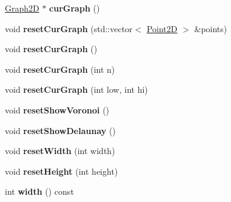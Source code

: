 \begin{DoxyCompactItemize}
\item 
\hyperlink{classcmst_1_1_graph2_d}{Graph2D} $\ast$ {\bfseries cur\+Graph} ()\hypertarget{classcmst_1_1_window_a83548b1c4406f37a812a0920fc4d6669}{}\label{classcmst_1_1_window_a83548b1c4406f37a812a0920fc4d6669}

\item 
void {\bfseries reset\+Cur\+Graph} (std\+::vector$<$ \hyperlink{classcmst_1_1_point2_d}{Point2D} $>$ \&points)\hypertarget{classcmst_1_1_window_adfa83ea52f2c09def65b79cdf57092ad}{}\label{classcmst_1_1_window_adfa83ea52f2c09def65b79cdf57092ad}

\item 
void {\bfseries reset\+Cur\+Graph} ()\hypertarget{classcmst_1_1_window_a08365866ac2ffa9793c25c92750341e2}{}\label{classcmst_1_1_window_a08365866ac2ffa9793c25c92750341e2}

\item 
void {\bfseries reset\+Cur\+Graph} (int n)\hypertarget{classcmst_1_1_window_a83743944c1c6429f0eb9f3c72c9b7f22}{}\label{classcmst_1_1_window_a83743944c1c6429f0eb9f3c72c9b7f22}

\item 
void {\bfseries reset\+Cur\+Graph} (int low, int hi)\hypertarget{classcmst_1_1_window_aa4ad17303edd88d526b66f9e6918fe7a}{}\label{classcmst_1_1_window_aa4ad17303edd88d526b66f9e6918fe7a}

\item 
void {\bfseries reset\+Show\+Voronoi} ()\hypertarget{classcmst_1_1_window_a16c34af3c8fd6be061df93e36cbb405e}{}\label{classcmst_1_1_window_a16c34af3c8fd6be061df93e36cbb405e}

\item 
void {\bfseries reset\+Show\+Delaunay} ()\hypertarget{classcmst_1_1_window_ae54c419d28bd352f52a3beffa6fc1f32}{}\label{classcmst_1_1_window_ae54c419d28bd352f52a3beffa6fc1f32}

\item 
void {\bfseries reset\+Width} (int width)\hypertarget{classcmst_1_1_window_a3f234daf3198e3611892515f1721de44}{}\label{classcmst_1_1_window_a3f234daf3198e3611892515f1721de44}

\item 
void {\bfseries reset\+Height} (int height)\hypertarget{classcmst_1_1_window_a8c4d7788d1932e73397c20b7a9639d69}{}\label{classcmst_1_1_window_a8c4d7788d1932e73397c20b7a9639d69}

\item 
int {\bfseries width} () const \hypertarget{classcmst_1_1_window_a5fc4ccbd9afed56cd17d341269028da2}{}\label{classcmst_1_1_window_a5fc4ccbd9afed56cd17d341269028da2}


\end{DoxyCompactItemize}

